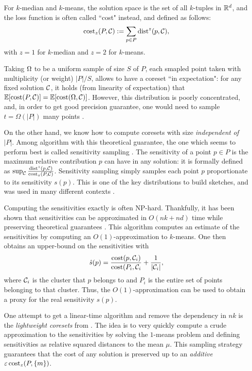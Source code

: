 For $k$-median and $k$-means, the solution space is the set of all $k$-tuples in $\mathbb{R}^d$, and the loss function is often called ``cost" instead, and defined as follows:
\[\operatorname{cost}_z(P, \mathcal C) := \sum_{p \in P} \operatorname{dist}^z(p, \mathcal C),\]
with $z=1$ for $k$-median and $z=2$ for $k$-means.

Taking $\Omega$ to be a uniform sample of size $S$ of $P$, each smapled point taken with multiplicity (or weight) $|P|/S$, allows to have a coreset ``in expectation": for any fixed solution $\mathcal C$, it holds (from linearity of expectation) that $\mathbb{E}[\operatorname{cost}(P, \mathcal C)] = \mathbb{E}[\operatorname{cost}(\Omega, \mathcal C)]$. However, this distribution is poorly concentrated, and, in order to get good precision guarantee, one would need to sample $t = \Omega(|P|)$ many points \cite{bachem2017practical}. 


On the other hand, we know how to compute coresets with size \textit{independent of $|P|$}. Among algorithm with this theoretical guarantee, the one which seems
to perform best is called sensitivity sampling \cite{chrisESA}.  The sensitivity of a point $p \in P$ is the maximum relative contribution $p$ can have in any
solution: it is formally defined as $\sup_{\mathcal C} \frac{\operatorname{dist}^z(p, \mathcal C)}{\operatorname{cost}_z(P, \mathcal C)}$.  Sensitivity sampling simply samples each point $p$
proportionate to its sensitivity $s(p)$. This is one of the key distributions to build sketches, and was used in many different contexts \cite{FeldmanL11,
CohenP15}.

Computing the sensitivities exactly is often NP-hard. Thankfully, it has been shown that sensitivities can be approximated in $O(nk+nd)$ time while preserving
theoretical guarantees \cite{varadarajan12,FeldmanL11}.  This algorithm computes an estimate of the sensitivities by computing an $O(1)$-approximation to
$k$-means. One then obtains an upper-bound on the sensitivities with
\[ \hat{s}(p) = \dfrac{\operatorname{cost}(p, \mathcal C_i)}{\operatorname{cost}(P_{i}, \mathcal C_i} + \dfrac{1}{|\mathcal C_i|}, \]
where $\mathcal C_i$ is the cluster that $p$ belongs to and $P_{i}$ is the entire set of points belonging to that cluster. Thus, the $O(1)$-approximation can be used
to obtain a proxy for the real sensitivity $s(p)$.

One attempt to get a linear-time algorithm and remove the dependency in $nk$ is the \emph{lightweight coresets} from \cite{bachem2018scalable}. The idea is to
very quickly compute a crude approximation to the sensitivities by solving the $1$-means problem and defining sensitivities as relative squared
distances to the mean $\mu$. This sampling strategy guarantees that the cost of any solution is preserved up to an \textit{additive} $\varepsilon
\operatorname{cost}_z(P, \{m\})$.

